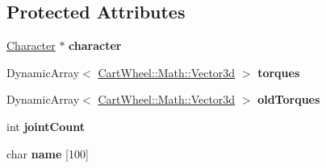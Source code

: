 \subsection*{Protected Attributes}
\begin{DoxyCompactItemize}
\item 
\hypertarget{classCartWheel_1_1Core_1_1Controller_a05b5ee702a77944fe1a7d9651a973544}{
\hyperlink{classCartWheel_1_1Core_1_1Character}{Character} $\ast$ {\bfseries character}}
\label{classCartWheel_1_1Core_1_1Controller_a05b5ee702a77944fe1a7d9651a973544}

\item 
\hypertarget{classCartWheel_1_1Core_1_1Controller_a1c7b7a40f27d6f77a4cb56c7b06ae12c}{
DynamicArray$<$ \hyperlink{classCartWheel_1_1Math_1_1Vector3d}{CartWheel::Math::Vector3d} $>$ {\bfseries torques}}
\label{classCartWheel_1_1Core_1_1Controller_a1c7b7a40f27d6f77a4cb56c7b06ae12c}

\item 
\hypertarget{classCartWheel_1_1Core_1_1Controller_ab2bb2b47a6e9ae462cf136cd95a0844a}{
DynamicArray$<$ \hyperlink{classCartWheel_1_1Math_1_1Vector3d}{CartWheel::Math::Vector3d} $>$ {\bfseries oldTorques}}
\label{classCartWheel_1_1Core_1_1Controller_ab2bb2b47a6e9ae462cf136cd95a0844a}

\item 
\hypertarget{classCartWheel_1_1Core_1_1Controller_a6497629a6a9b475082d782d1540ad4db}{
int {\bfseries jointCount}}
\label{classCartWheel_1_1Core_1_1Controller_a6497629a6a9b475082d782d1540ad4db}

\item 
\hypertarget{classCartWheel_1_1Core_1_1Controller_a120c81c0c695800cf2a3f7ed1cd75b76}{
char {\bfseries name} \mbox{[}100\mbox{]}}
\label{classCartWheel_1_1Core_1_1Controller_a120c81c0c695800cf2a3f7ed1cd75b76}

\end{DoxyCompactItemize}
